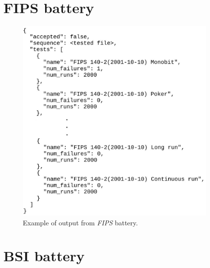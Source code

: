 \documentclass[
  digital,     %
  oneside,     %
  nosansbold,  %
  nocolorbold, %
  nolof,         %
  nolot,         %
]{fithesis4}
\begin{document}
\newpage

\section{FIPS battery} \label{append:fips-output}
\begin{figure}[h]
  \begin{center}
    \includegraphics[width=10cm]{figures/outputs-appendix/fips.jpg}
  \end{center}
  \caption{Example of output from \emph{FIPS} battery.}
  \label{fig:fips_example}
\end{figure}

\newpage

\section{BSI battery} \label{append:bsi-output}
\end{document}
